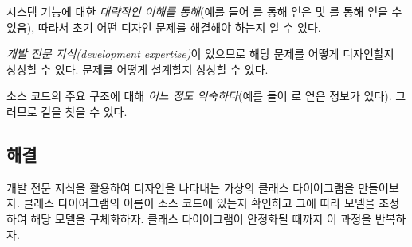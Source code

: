\documentclass[a4paper,10pt,twoside]{book}
\begin{document}
\begin{bulletlist}
\item 시스템 기능에 대한 \emph{대략적인 이해를 통해}(예를 들어 를 통해 얻은  및 를 통해 얻을 수 있음), 따라서 초기 어떤 디자인 문제를 해결해야 하는지 알 수 있다.

\item \emph{개발 전문 지식(development expertise)}이 있으므로 해당 문제를 어떻게 디자인할지 상상할 수 있다. 문제를 어떻게 설계할지 상상할 수 있다.

\item 소스 코드의 주요 구조에 대해 \emph{어느 정도 익숙하다}(예를 들어 로 얻은 정보가 있다). 그러므로 길을 찾을 수 있다.
\end{bulletlist}

\subsection*{해결}

개발 전문 지식을 활용하여 디자인을 나타내는 가상의 클래스 다이어그램을 만들어보자. 클래스 다이어그램의 이름이 소스 코드에 있는지 확인하고 그에 따라 모델을 조정하여 해당 모델을 구체화하자. 클래스 다이어그램이 안정화될 때까지 이 과정을 반복하자.
\end{document}
